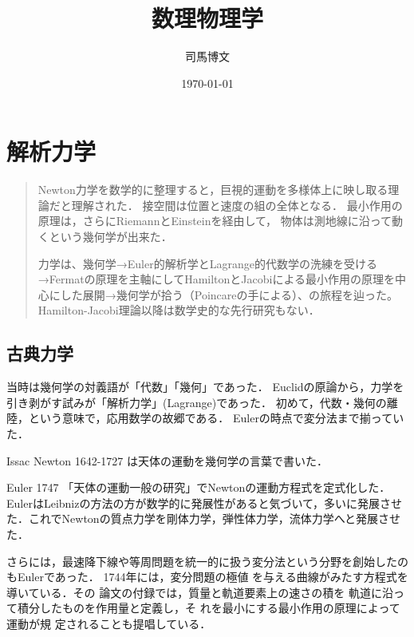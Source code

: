 \documentclass[uplatex,dvipdfmx]{jsreport}
\title{数理物理学}
\author{司馬博文}
\date{\today}
\begin{document}
\tableofcontents

\chapter{解析力学}

\begin{quotation}
    Newton力学を数学的に整理すると，巨視的運動を多様体上に映し取る理論だと理解された．
    接空間は位置と速度の組の全体となる．
    最小作用の原理は，さらにRiemannとEinsteinを経由して，
    物体は測地線に沿って動くという幾何学が出来た．

    力学は、幾何学→Euler的解析学とLagrange的代数学の洗練を受ける→Fermatの原理を主軸にしてHamiltonとJacobiによる最小作用の原理を中心にした展開→幾何学が拾う（Poincareの手による）、の旅程を辿った。
    Hamilton-Jacobi理論以降は数学史的な先行研究もない．
\end{quotation}

\section{古典力学}

\begin{tcolorbox}[colframe=ForestGreen, colback=ForestGreen!10!white,breakable,colbacktitle=ForestGreen!40!white,coltitle=black,fonttitle=\bfseries\sffamily,
title=]
    当時は幾何学の対義語が「代数」「幾何」であった．
    Euclidの原論から，力学を引き剥がす試みが「解析力学」(Lagrange)であった．
    初めて，代数・幾何の離陸，という意味で，応用数学の故郷である．
    Eulerの時点で変分法まで揃っていた．
\end{tcolorbox}

\begin{history}[幾何学の時代]
    Issac Newton 1642-1727 は天体の運動を幾何学の言葉で書いた．
\end{history}

\begin{history}
    Euler 1747 \cite{Euler1747}「天体の運動一般の研究」でNewtonの運動方程式を定式化した．
    EulerはLeibnizの方法の方が数学的に発展性があると気づいて，多いに発展させた．これでNewtonの質点力学を剛体力学，弾性体力学，流体力学へと発展させた．

    さらには，最速降下線や等周問題を統一的に扱う変分法という分野を創始したのもEulerであった．
    1744年には，変分問題の極値
    を与える曲線がみたす方程式を導いている．その
    論文の付録では，質量と軌道要素上の速さの積を
    軌道に沿って積分したものを作用量と定義し，そ
    れを最小にする最小作用の原理によって運動が規
    定されることも提唱している．
\end{history}
\end{document}

